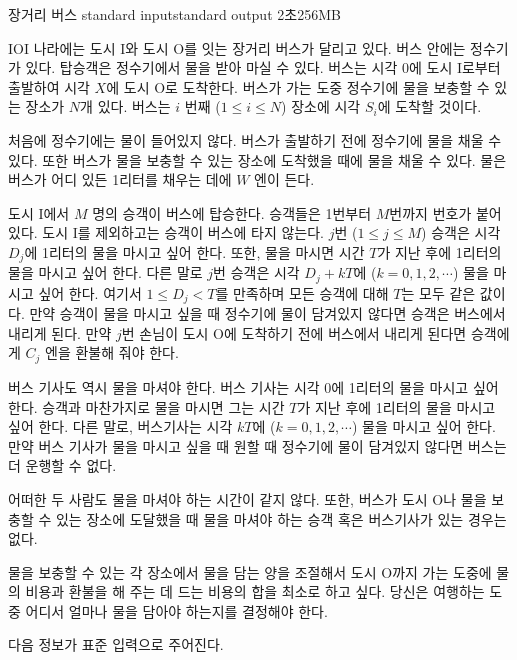 \begin{problem}{장거리 버스}
	{standard input}{standard output}
	{2초}{256MB}{}
	
	IOI 나라에는 도시 I와 도시 O를 잇는 장거리 버스가 달리고 있다. 버스 안에는 정수기가 있다. 탑승객은 정수기에서 물을 받아 마실 수 있다. 버스는 시각 $0$에 도시 I로부터 출발하여 시각 $X$에 도시 O로 도착한다. 버스가 가는 도중 정수기에 물을 보충할 수 있는 장소가 $N$개 있다. 버스는 $i$ 번째 ($1 \le i \le N$) 장소에 시각 $S_i$에 도착할 것이다.
	
	처음에 정수기에는 물이 들어있지 않다. 버스가 출발하기 전에 정수기에 물을 채울 수 있다. 또한 버스가 물을 보충할 수 있는 장소에 도착했을 때에 물을 채울 수 있다. 물은 버스가 어디 있든 1리터를 채우는 데에 $W$ 엔이 든다.
	
	도시 I에서 $M$ 명의 승객이 버스에 탑승한다. 승객들은 1번부터 $M$번까지 번호가 붙어있다. 도시 I를 제외하고는 승객이 버스에 타지 않는다. $j$번 ($1 \le j \le M$) 승객은 시각 $D_j$에 1리터의 물을 마시고 싶어 한다. 또한, 물을 마시면 시간 $T$가 지난 후에 1리터의 물을 마시고 싶어 한다. 다른 말로 $j$번 승객은 시각 $D_j + kT$에 ($k = 0, 1, 2, \cdots$) 물을 마시고 싶어 한다. 여기서 $1 \le D_j < T$를 만족하며 모든 승객에 대해 $T$는 모두 같은 값이다. 만약 승객이 물을 마시고 싶을 때 정수기에 물이 담겨있지 않다면 승객은 버스에서 내리게 된다. 만약 $j$번 손님이 도시 O에 도착하기 전에 버스에서 내리게 된다면 승객에게 $C_j$ 엔을 환불해 줘야 한다.
	
	버스 기사도 역시 물을 마셔야 한다. 버스 기사는 시각 0에 1리터의 물을 마시고 싶어 한다. 승객과 마찬가지로 물을 마시면 그는 시간 $T$가 지난 후에 1리터의 물을 마시고 싶어 한다. 다른 말로, 버스기사는 시각 $kT$에 ($k= 0, 1, 2, \cdots$) 물을 마시고 싶어 한다. 만약 버스 기사가 물을 마시고 싶을 때 원할 때 정수기에 물이 담겨있지 않다면 버스는 더 운행할 수 없다.
	
	어떠한 두 사람도 물을 마셔야 하는 시간이 같지 않다. 또한, 버스가 도시 O나 물을 보충할 수 있는 장소에 도달했을 때 물을 마셔야 하는 승객 혹은 버스기사가 있는 경우는 없다.
	
	물을 보충할 수 있는 각 장소에서 물을 담는 양을 조절해서 도시 O까지 가는 도중에 물의 비용과 환불을 해 주는 데 드는 비용의 합을 최소로 하고 싶다. 당신은 여행하는 도중 어디서 얼마나 물을 담아야 하는지를 결정해야 한다.	
	
	
	\InputFile
	
	다음 정보가 표준 입력으로 주어진다.
	

\end{problem}
